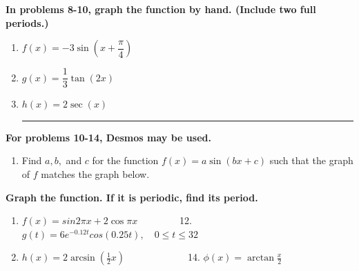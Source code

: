 \documentclass[letterpaper]{article}
\begin{document}
\noindent	\textbf{In problems 8-10, graph the function by hand. (Include two full periods.)}
\begin{enumerate}[resume]
\item $f(x) = -3\sin \left( x+\dfrac{\pi}{4}\right)$
\item $g(x) = \dfrac{1}{3} \tan (2x)$
\item $h(x) = 2\sec (x)$
\mbox{}\\ 
\hrule
\end{enumerate}
\noindent	\textbf{For problems 10-14, Desmos may be used.}
\begin{enumerate}[resume]
\item Find $a, b,$ and $c$ for the function $f(x)=a\sin(bx+c)$ such that the graph of $f$ matches the graph below. 
\end{enumerate}
\noindent	\textbf{Graph the function. If it is periodic, find its period.}
\begin{enumerate}[resume]
\item $f(x)=sin2\pi x+2\cos\pi x \quad\quad\quad\quad$ 12. $g(t)=6e^{-0.12t}cos(0.25t), \quad 0\leq t\leq 32$
\addtocounter{enumi}{1}
\item $h(x)=2\arcsin\left(\frac{1}{2}x\right) \quad\quad\quad\quad\quad\quad\,$ 14. $\phi(x)=\arctan\frac{x}{2}$
\end{enumerate}
\pagebreak
\mbox{}\\
\mbox{}\\
\mbox{}\\
\mbox{}\\
\end{document}
